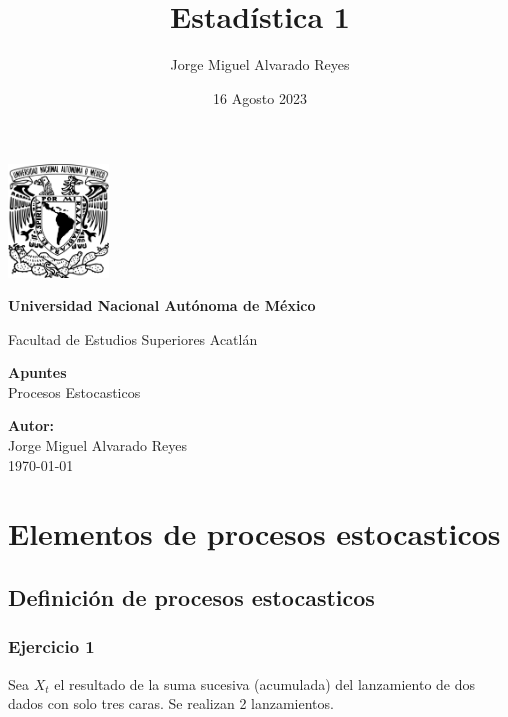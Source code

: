 \documentclass{article}
\title{Estadística 1}
\author{Jorge Miguel Alvarado Reyes}
\date{16 Agosto 2023}
\begin{document}
\begin{titlepage}
    \begin{center}
        \includegraphics[width=0.2\textwidth]{../../unam.png}
        \vspace*{.5cm}

        \LARGE
        \textbf{Universidad Nacional Autónoma de México}

        \vspace{0.5cm}
        \LARGE
        Facultad de Estudios Superiores Acatlán

        \vspace{2cm}

        \textbf{Apuntes} \\
        Procesos Estocasticos

        \vfill

        \vspace{1cm}

        \textbf{\large Autor:} \\
        Jorge Miguel Alvarado Reyes \\
        \vspace{.5cm}
        \normalsize \today

    \end{center}
\end{titlepage}
\newpage

\tableofcontents

\newpage

\section{Elementos de procesos estocasticos}

\subsection{Definición de procesos estocasticos}

\subsubsection{Ejercicio 1}

Sea \(X_t\) el resultado de la suma sucesiva (acumulada) del lanzamiento de dos dados con solo tres caras. Se realizan 2 lanzamientos.
\end{document}
